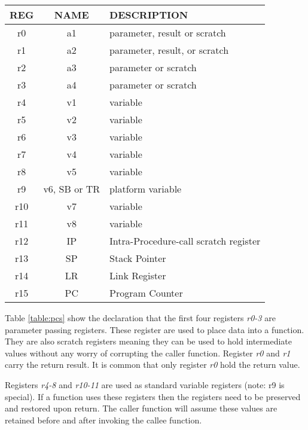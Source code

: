 \begin{table*}[ht]
\centering
  \begin{tabular}{ | c | c | l |}
    \hline
    REG & NAME & DESCRIPTION \\ \hline
    r0  & a1   & parameter, result or scratch  \\ \hline
    r1  & a2   & parameter, result, or scratch  \\ \hline
    r2  & a3   & parameter or scratch \\ \hline
    r3  & a4   & parameter or scratch \\ \hline  
    r4  & v1   & variable  \\ \hline
    r5  & v2   & variable  \\ \hline
    r6  & v3   & variable  \\ \hline  
    r7  & v4   & variable  \\ \hline
    r8  & v5   & variable  \\ \hline
    r9  & v6, SB or TR & platform variable   \\ \hline  
    r10 & v7   & variable   \\ \hline
    r11 & v8  & variable  \\ \hline  
    r12 & IP  & Intra-Procedure-call scratch register  \\ \hline
    r13 & SP  & Stack Pointer \\ \hline
    r14 & LR  & Link Register \\ \hline 
    r15 & PC  & Program Counter\\ \hline  
  \end{tabular}
\caption{Register allocation}
\label{table:pcs}
\end{table*}

Table \ref{table:pcs} show the declaration that the first four registers \textit{r0-3} are parameter passing registers. These register are used to place data into a function. They are also scratch registers meaning they can be used to hold intermediate values without any worry of corrupting the caller function. Register \textit{r0} and \textit{r1} carry the return result. It is common that only register \textit{r0} hold the return value. 
 
Registers \textit{r4-8} and \textit{r10-11} are used as standard variable registers (note: r9 is special). If a function uses these registers then the registers need to be preserved and restored upon return. The caller function will assume these values are retained before and after invoking the callee function. 

